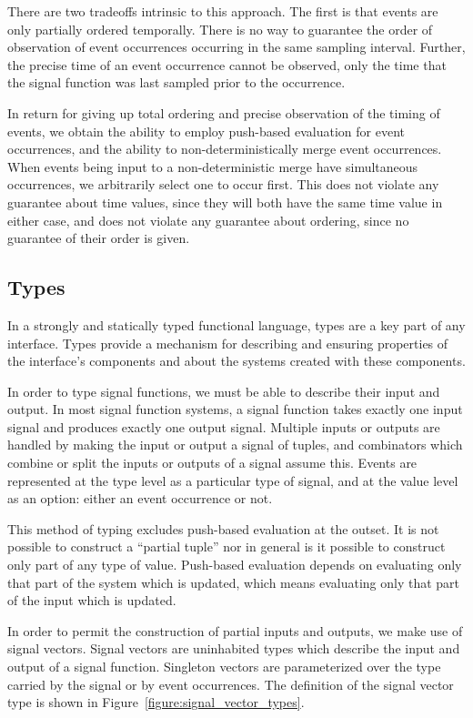 There are two tradeoffs intrinsic to this approach. The first is that events are
only partially ordered temporally. There is no way to guarantee the order of
observation of event occurrences occurring in the same sampling interval.
Further, the precise time of an event occurrence cannot be observed, only the 
time that the signal function was last sampled prior to the occurrence.

In return for giving up total ordering and precise observation of the timing of 
events, we obtain the ability to employ push-based evaluation for event
occurrences, and the ability to non-deterministically merge event occurrences.
When events being input to a non-deterministic merge have simultaneous
occurrences, we arbitrarily select one to occur first. This does not violate any
guarantee about time values, since they will both have the same time value in
either case, and does not violate any guarantee about ordering, since no
guarantee of their order is given.

\subsection{Types}
\label{subsection:System_Design_and_Interface-Types}

In a strongly and statically typed functional language, types are a key part of
any interface. Types provide a mechanism for describing and ensuring properties
of the interface's components and about the systems created with these
components. 

In order to type signal functions, we must be able to describe their input and
output. In most signal function systems, a signal function takes exactly one
input signal and produces exactly one output signal. Multiple inputs or outputs
are handled by making the input or output a signal of tuples, and combinators
which combine or split the inputs or outputs of a signal assume this. Events are
represented at the type level as a particular type of signal, and at the value
level as an option: either an event occurrence or not.

This method of typing excludes push-based evaluation at the outset.
It is not possible to construct a ``partial tuple'' nor in general is it
possible to construct only part of any type of value. Push-based evaluation
depends on evaluating only that part of the system which is updated, which means
evaluating only that part of the input which is updated.

In order to permit the construction of partial inputs and outputs, we make use
of signal vectors. Signal vectors are uninhabited types which describe the input
and output of a signal function. Singleton vectors are parameterized over the
type carried by the signal or by event occurrences. The definition of the signal
vector type is shown in Figure~\ref{figure:signal_vector_types}. 

